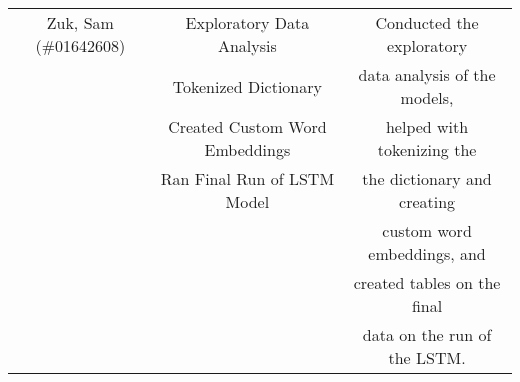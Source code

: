 \documentclass[11pt]{article}
\begin{document}
\begin{table}[H]
\begin{tabular}{c|c|c}
        \hline
        Zuk, Sam (\#01642608)       & Exploratory Data Analysis      & Conducted the exploratory  \\
                                    & Tokenized Dictionary           &data analysis of the models,\\
                                    & Created Custom Word Embeddings &helped with tokenizing the  \\
                                    & Ran Final Run of LSTM Model    &the dictionary and creating \\
                                    &                                &custom word embeddings, and \\
                                    &                                &created tables on the final \\
                                    &                                &data on the run of the LSTM.\\
        \hline
    \end{tabular}
    \label{tab:my_label}
\end{table}




\end{document}
